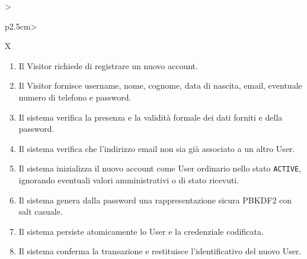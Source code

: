 \begin{tabularx}{\textwidth}{>{\raggedright\arraybackslash\sffamily\bfseries\color{black!75}}p{2.5cm}>{\raggedright\arraybackslash}X}
\begin{minipage}[t]{\linewidth}
\begin{enumerate}[leftmargin=1.4em,nosep,label=\arabic*.]
\item Il Visitor richiede di registrare un nuovo account.
\item Il Visitor fornisce username, nome, cognome, data di nascita, email, eventuale numero di telefono e password.
\item Il sistema verifica la presenza e la validità formale dei dati forniti e della password.
\item Il sistema verifica che l'indirizzo email non sia già associato a un altro User.
\item Il sistema inizializza il nuovo account come User ordinario nello stato \texttt{ACTIVE}, ignorando eventuali valori amministrativi o di stato ricevuti.
\item Il sistema genera dalla password una rappresentazione sicura PBKDF2 con salt casuale.
\item Il sistema persiste atomicamente lo User e la credenziale codificata.
\item Il sistema conferma la transazione e restituisce l'identificativo del nuovo User.
\end{enumerate}\vspace{3pt}\end{minipage} \\[2pt] \hline

\end{tabularx}
